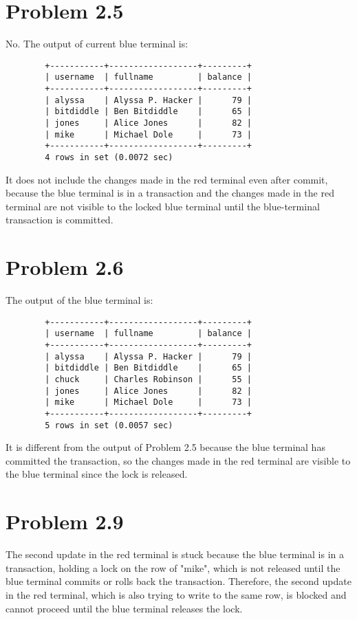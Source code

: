 \documentclass{article}
\begin{document}
\begin{CJK*}{UTF8}{gbsn}
    \section*{Problem 2.5}
    No. The output of current blue terminal is:
    \begin{lstlisting}
        +-----------+------------------+---------+
        | username  | fullname         | balance |
        +-----------+------------------+---------+
        | alyssa    | Alyssa P. Hacker |      79 |
        | bitdiddle | Ben Bitdiddle    |      65 |
        | jones     | Alice Jones      |      82 |
        | mike      | Michael Dole     |      73 |
        +-----------+------------------+---------+
        4 rows in set (0.0072 sec)
    \end{lstlisting}
    It does not include the changes made in the red terminal even after commit,
    because the blue terminal is in a transaction and the changes made in the red
    terminal are not visible to the locked blue terminal until the blue-terminal transaction is committed.
    \section*{Problem 2.6}
    The output of the blue terminal is:
    \begin{lstlisting}
        +-----------+------------------+---------+
        | username  | fullname         | balance |
        +-----------+------------------+---------+
        | alyssa    | Alyssa P. Hacker |      79 |
        | bitdiddle | Ben Bitdiddle    |      65 |
        | chuck     | Charles Robinson |      55 |
        | jones     | Alice Jones      |      82 |
        | mike      | Michael Dole     |      73 |
        +-----------+------------------+---------+
        5 rows in set (0.0057 sec)
    \end{lstlisting}
    It is different from the output of Problem 2.5 because the blue terminal
    has committed the transaction, so the changes made in the red terminal are
    visible to the blue terminal since the lock is released.

    \section*{Problem 2.9}
    The second update in the red terminal is stuck because the blue
    terminal is in a transaction, holding a lock on the row of "mike", which
    is not released until the blue terminal commits or rolls back the transaction.
    Therefore, the second update in the red terminal, which is also trying to
    write to the same row, is blocked and cannot proceed until the blue terminal
    releases the lock.


\end{CJK*}
\end{document}
